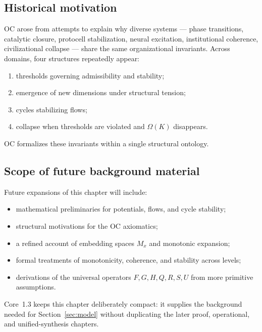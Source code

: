 \subsection{Historical motivation}

OC arose from attempts to explain why diverse systems — phase transitions, catalytic closure, protocell stabilization, neural excitation, institutional coherence, civilizational collapse — share the same organizational invariants.  
Across domains, four structures repeatedly appear:

\begin{enumerate}
    \item thresholds governing admissibility and stability;
    \item emergence of new dimensions under structural tension;
    \item cycles stabilizing flows;
    \item collapse when thresholds are violated and \(\Omega(K)\) disappears.
\end{enumerate}

OC formalizes these invariants within a single structural ontology.

\subsection{Scope of future background material}

Future expansions of this chapter will include:

\begin{itemize}
    \item mathematical preliminaries for potentials, flows, and cycle stability;
    \item structural motivations for the OC axiomatics;
    \item a refined account of embedding spaces \(M_x\) and monotonic expansion;
    \item formal treatments of monotonicity, coherence, and stability across levels;
    \item derivations of the universal operators \(F,G,H,Q,R,S,U\) from more primitive assumptions.
\end{itemize}

Core~1.3 keeps this chapter deliberately compact: it supplies the background
needed for Section~\ref{sec:model} without duplicating the later proof,
operational, and unified-synthesis chapters.
